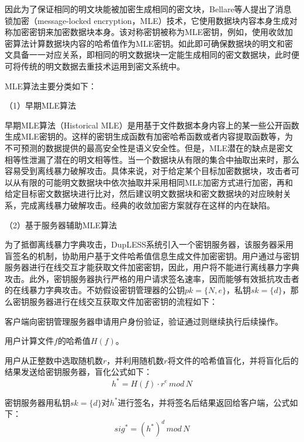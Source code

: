\documentclass[promaster]{thesis-uestc}
\begin{document}
因此为了保证相同的明文块能被加密生成相同的密文块，Bellare等人提出了消息锁加密（message-locked encryption，MLE）技术，它使用数据块内容本身生成对称加密密钥来加密数据块本身。该对称密钥被称为MLE密钥，例如，使用收敛加密算法计算数据块内容的哈希值作为MLE密钥。如此即可确保数据块的明文和密文具备一一对应关系，即相同的明文数据块一定能生成相同的密文数据块，此时便可将传统的明文数据去重技术运用到密文系统中。

MLE算法主要分类如下：

（1）早期MLE算法

早期MLE算法（Historical MLE）是用基于文件数据本身内容上的某一些公开函数生成MLE密钥的。这样的密钥生成函数有加密哈希函数或者内容提取函数等，为不可预测的数据提供的最高安全性是语义安全性。但是，MLE潜在的缺点是密文相等性泄漏了潜在的明文相等性。当一个数据块从有限的集合中抽取出来时，那么容易受到离线暴力破解攻击。具体来说，对于给定某个目标加密数据块，攻击者可以从有限的可能明文数据块中依次抽取并采用相同MLE加密方式进行加密，再和给定目标密文数据块进行比对，然后建议明文数据块和密文数据块的对应映射关系，完成离线暴力破解攻击。经典的收敛加密方案就存在这样的内在缺陷。

（2）基于服务器辅助MLE算法\label{RSA盲签名}

为了抵御离线暴力字典攻击，DupLESS系统引入一个密钥服务器，该服务器采用盲签名的机制，协助用户基于文件哈希值信息生成文件加密密钥。用户通过与密钥服务器进行在线交互才能获取文件加密密钥，因此，用户将不能进行离线暴力字典攻击。此外，密钥服务器执行严格的用户请求签名速率，因而能够有效抵抗攻击者的在线暴力字典攻击。不妨假设密钥管理器的公钥$pk = \{N, e\}$，私钥$sk=\{d\}$，那么密钥服务器进行在线交互获取文件加密密钥的流程如下：

客户端向密钥管理服务器申请用户身份验证，验证通过则继续执行后续操作。

用户计算文件$f$的哈希值$H(f)$。

用户从正整数中选取随机数$r$，并利用随机数$r$将文件的哈希值盲化，并将盲化后的结果发送给密钥服务器，盲化公式如下：
\begin{equation}
    h^* = H(f) \cdot r^e\, mod\, N
\end{equation}

密钥服务器用私钥$sk = \{d\}$对$h^*$进行签名，并将签名后结果返回给客户端，公式如下：
\begin{equation}
    sig^* = (h^*)^d\,mod\,N
\end{equation}
\end{document}
